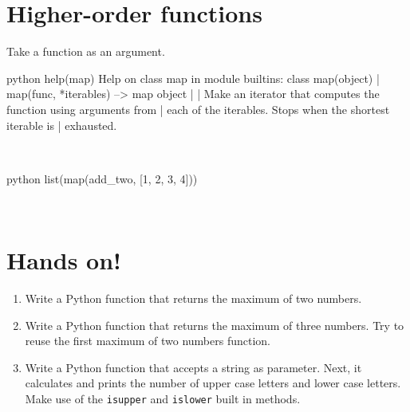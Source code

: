 \documentclass[aspectratio=1610,slidestop]{beamer}
\begin{document}
\section{Higher-order functions}
\begin{pframe}
 Take a function as an argument.
 \begin{ipython}
  \begin{pythonin}{python}
help(map)
Help on class map in module builtins:
class map(object)
 |  map(func, *iterables) --> map object
 |
 |  Make an iterator that computes the function using arguments from
 |  each of the iterables.  Stops when the shortest iterable is
 |  exhausted.
  \end{pythonin}
  \\

 \begin{pythonin}{python}
list(map(add_two, [1, 2, 3, 4]))
  \end{pythonin}
  \\
  \begin{pythonout}
[3, 4, 5, 6]
  \end{pythonout}
 \end{ipython}
\end{pframe}





\section{Hands on!}
\begin{pframe}
 \vspace{-0.5cm}
 \begin{enumerate}
  \item Write a Python function that returns the maximum of two numbers.
  \item Write a Python function that returns the maximum of three numbers.
  Try to reuse the first maximum of two numbers function.
  \item Write a Python function that accepts a string as parameter.
  Next, it calculates and prints the number of upper case letters and lower
  case letters. Make use of the \texttt{isupper} and
  \texttt{islower} built in methods.
 \end{enumerate}
\end{pframe}


\end{document}
